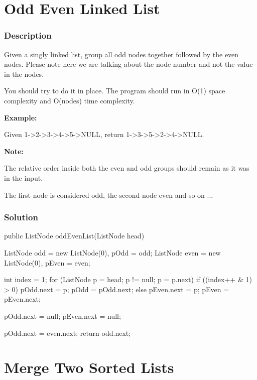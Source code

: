 \newpage

\section{Odd Even Linked List} %

\subsubsection{Description}
Given a singly linked list, group all odd nodes together followed by the even nodes. Please note here we are talking about the node number and not the value in the nodes.

You should try to do it in place. The program should run in O(1) space complexity and O(nodes) time complexity.

\textbf{Example:}
\begin{Code}
Given 1->2->3->4->5->NULL,
return 1->3->5->2->4->NULL.
\end{Code}

\textbf{Note:}

The relative order inside both the even and odd groups should remain as it was in the input.

The first node is considered odd, the second node even and so on ...

\subsubsection{Solution}

\begin{Code}
public ListNode oddEvenList(ListNode head) {
    ListNode odd = new ListNode(0), pOdd = odd;
    ListNode even = new ListNode(0), pEven = even;

    int index = 1;
    for (ListNode p = head; p != null; p = p.next) {
        if ((index++ & 1) > 0) {
            pOdd.next = p;
            pOdd = pOdd.next;
        } else {
            pEven.next = p;
            pEven = pEven.next;
        }
    }

    pOdd.next = null;
    pEven.next = null;

    pOdd.next = even.next;
    return odd.next;
}
\end{Code}

\newpage

\section{Merge Two Sorted Lists} %


